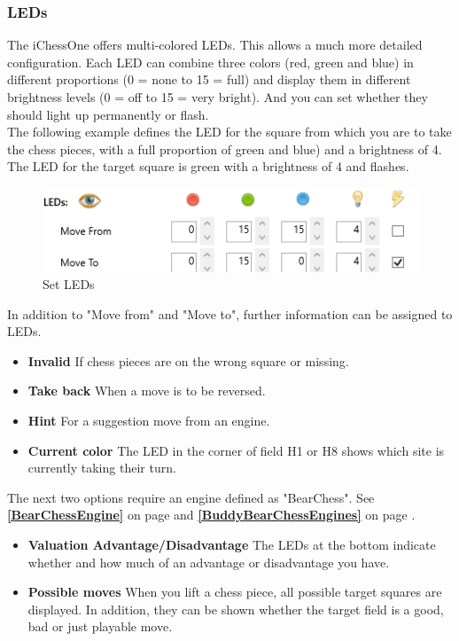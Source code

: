 \documentclass[11pt,a4paper]{article}
\begin{document}
\subsubsection{LEDs}

The iChessOne offers multi-colored LEDs. This allows a much more detailed configuration. Each LED can combine three colors ({\color{red}red}, {\color{ForestGreen}green} and {\color{blue}blue}) in different proportions (0 = none to 15 = full) and display them in different brightness levels (0 = off to 15 = very bright).
And you can set whether they should light up permanently or flash.\\
The following example defines the LED for the square from which you are to take the chess pieces, with a full proportion of  {\color{ForestGreen}green} and {\color{blue}blue}) and a brightness of 4.
The LED for the target square is {\color{ForestGreen}green} with a brightness of 4 and flashes.

\begin{figure}[H]
	\centering
	\includegraphics[scale=1.0]{iChessOne3.png}
	\caption{Set LEDs }
	\label{fig:iChessOne6}
\end{figure}
In addition to "Move from" and "Move to", further information can be assigned to LEDs.
\begin{itemize}
	\item \textbf{Invalid} If chess pieces are on the wrong square or missing.
	\item \textbf{Take back} When a move is to be reversed.
    \item \textbf{Hint} For a suggestion move from an engine.
    \item \textbf{Current color} The LED in the corner of field H1 or H8 shows which site is currently taking their turn.	       
\end{itemize}

The next two options require an engine defined as "BearChess". See \textbf{\ref{BearChessEngine}  } on page \pageref{BearChessEngine} and \textbf{\ref{BuddyBearChessEngines}  } on page \pageref{BuddyBearChessEngines}.

\begin{itemize}
	\item \textbf{Valuation Advantage/Disadvantage} The LEDs at the bottom indicate whether and how much of an advantage or disadvantage you have.
	\item \textbf{Possible moves} When you lift a chess piece, all possible target squares are displayed. In addition, they can be shown whether the target field is a good, bad or just playable move.
\end{itemize}
\end{document}
